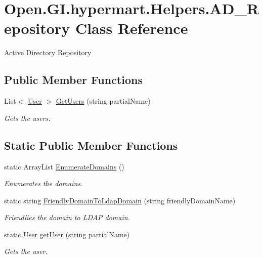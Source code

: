\hypertarget{class_open_1_1_g_i_1_1hypermart_1_1_helpers_1_1_a_d___repository}{}\section{Open.\+G\+I.\+hypermart.\+Helpers.\+A\+D\+\_\+\+Repository Class Reference}
\label{class_open_1_1_g_i_1_1hypermart_1_1_helpers_1_1_a_d___repository}


Active Directory Repository  


\subsection*{Public Member Functions}
\begin{DoxyCompactItemize}
\item 
List$<$ \hyperlink{class_open_1_1_g_i_1_1hypermart_1_1_models_1_1_user}{User} $>$ \hyperlink{class_open_1_1_g_i_1_1hypermart_1_1_helpers_1_1_a_d___repository_acf1eb85047c96cf0925f10a7acd96859}{Get\+Users} (string partial\+Name)
\begin{DoxyCompactList}\small\item\em Gets the users. \end{DoxyCompactList}\end{DoxyCompactItemize}
\subsection*{Static Public Member Functions}
\begin{DoxyCompactItemize}
\item 
static Array\+List \hyperlink{class_open_1_1_g_i_1_1hypermart_1_1_helpers_1_1_a_d___repository_a648df6740e7c4c8b603bf8dac1c0d4a1}{Enumerate\+Domains} ()
\begin{DoxyCompactList}\small\item\em Enumerates the domains. \end{DoxyCompactList}\item 
static string \hyperlink{class_open_1_1_g_i_1_1hypermart_1_1_helpers_1_1_a_d___repository_a69769f94231c2d4347184f3b5d6a14a6}{Friendly\+Domain\+To\+Ldap\+Domain} (string friendly\+Domain\+Name)
\begin{DoxyCompactList}\small\item\em Friendlies the domain to L\+D\+AP domain. \end{DoxyCompactList}\item 
static \hyperlink{class_open_1_1_g_i_1_1hypermart_1_1_models_1_1_user}{User} \hyperlink{class_open_1_1_g_i_1_1hypermart_1_1_helpers_1_1_a_d___repository_ab3cdd5f9a962e26fcb50033a5dc4fc0f}{get\+User} (string partial\+Name)
\begin{DoxyCompactList}\small\item\em Gets the user. \end{DoxyCompactList}\end{DoxyCompactItemize}


